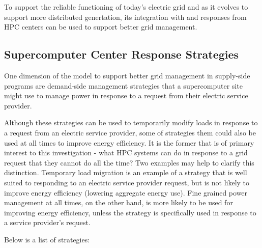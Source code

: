 To support the reliable functioning of today's electric grid and as it evolves to support more distributed genertation, its integration with and responses from 
HPC centers can be used to support better grid management.

\subsection{Supercomputer Center Response Strategies}

One dimension of the model to support better grid management in supply-side programs are demand-side 
management strategies 
that a supercomputer site might use to manage power in response to a request from their electric service provider. 

Although these strategies can be used to temporarily modify loads in response to a
request from an electric service provider, some of strategies them could also be used
at all times to improve energy efficiency. It is the former that is of primary
interest to this investigation - what HPC systems can do in response to a grid request that they cannot do all the time? 
Two examples may help to clarify this
distinction. Temporary load migration is an example of a strategy that is well suited
to responding to an electric service provider request, but is not likely to
improve energy efficiency (lowering aggregate energy use). Fine grained power management at all times, on the other hand,
is more likely to be used for improving energy efficiency, unless the strategy is specifically used in response to a service provider's request.

Below is a list of strategies:

